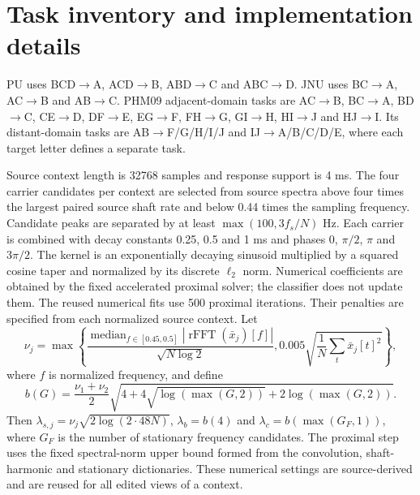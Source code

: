 \section{Task inventory and implementation details}
\label{app:tasks}
PU uses BCD$\to$A, ACD$\to$B, ABD$\to$C and ABC$\to$D. JNU uses
BC$\to$A, AC$\to$B and AB$\to$C. PHM09 adjacent-domain tasks are
AC$\to$B, BC$\to$A, BD$\to$C, CE$\to$D, DF$\to$E,
EG$\to$F, FH$\to$G, GI$\to$H, HI$\to$J and HJ$\to$I.
Its distant-domain tasks are AB$\to$F/G/H/I/J and IJ$\to$A/B/C/D/E,
where each target letter defines a separate task.

Source context length is 32768 samples and response support is 4 ms.
The four carrier candidates per context are selected from source spectra above
four times the largest paired source shaft rate and below 0.44 times the
sampling frequency. Candidate peaks are separated by at least
$\max(100,3f_s/N)$ Hz. Each carrier is combined with decay constants
0.25, 0.5 and 1 ms and phases 0, $\pi/2$, $\pi$ and $3\pi/2$.
The kernel is an exponentially decaying sinusoid multiplied by a squared
cosine taper and normalized by its discrete $\ell_2$ norm.
Numerical coefficients are obtained by the fixed accelerated proximal solver;
the classifier does not update them.
The reused numerical fits use 500 proximal iterations. Their penalties are
specified from each normalized source context. Let
\begin{equation}
 \nu_j=\max\!\left\{
 \frac{\operatorname{median}_{f\in[0.45,0.5]}
       |\operatorname{rFFT}(\bar x_j)[f]|}{\sqrt{N\log 2}},
 0.005\sqrt{\frac1N\sum_t\bar x_j[t]^2}\right\},
\end{equation}
where $f$ is normalized frequency, and define
\begin{equation}
 b(G)=\frac{\nu_1+\nu_2}{2}
 \sqrt{4+4\sqrt{\log(\max(G,2))}+2\log(\max(G,2))}.
\end{equation}
Then $\lambda_{s,j}=\nu_j\sqrt{2\log(2\cdot48N)}$,
$\lambda_b=b(4)$ and $\lambda_c=b(\max(G_F,1))$, where $G_F$ is the number
of stationary frequency candidates. The proximal step uses the fixed
spectral-norm upper bound formed from the convolution, shaft-harmonic and
stationary dictionaries. These numerical settings are source-derived and
are reused for all edited views of a context.
